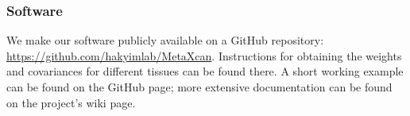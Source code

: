 \documentclass[10pt]{article}
\begin{document}





\subsubsection*{Software}

We make our software publicly available on a GitHub repository: \url{https://github.com/hakyimlab/MetaXcan}. Instructions for obtaining the weights and covariances for different tissues can be found there. A short working example can be found on the GitHub page; more extensive documentation can be found on the project's wiki page.


 
\end{document}
